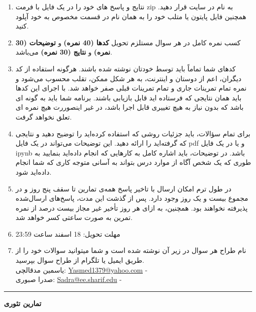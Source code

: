 \documentclass[a4paper]{article}
\begin{document}
\begin{enumerate}
	\item 
نتایج و پاسخ های خود را در یک فایل با فرمت zip به نام
 در سایت  
\href{https://quera.org/course/add_to_course/course/10598/}{} 
 قرار دهید. همچنین فایل پایتون یا متلب خود را به همان نام در قسمت مخصوص به خود آپلود کنید.
\item 
کسب نمره کامل در هر سوال مستلزم تحویل  
\textbf{کدها (40 نمره)}
 و
\textbf{توضیحات (30 نمره)}
و
\textbf{نتایج (30 نمره)}
 می‌باشد. 
\item 
کدهای شما تماماً باید توسط خودتان نوشته شده باشند. هرگونه استفاده از کد دیگران، اعم از دوستان و اینترنت، به هر شکل ممکن، تقلب محسوب می‌شود و نمره تمام تمرینات جاری و تمام تمرینات قبلی صفر خواهد شد. با اجرای این کدها باید همان نتایجی که فرستاده اید قابل بازیابی باشند. برنامه شما باید به گونه ای باشد که بدون نیاز به هیچ تغییری قابل اجرا باشد، در غیر اینصوررت هیچ نمره ای تعلق نخواهد گرفت. 
\item 
برای تمام سؤالات، باید جزئیات روشی که استفاده کرده‌اید را توضیح دهید و نتایجی که گرفته‌اید را ارائه دهید. این توضیحات می‌تواند در یک فایل  pdf  و یا در یک فایل  ipynb باشد. در توضیحات، باید اشاره کامل به کارهایی که انجام داده‌اید بنمایید به طوری که یک شخص آگاه از موارد درس بتواند به آسانی متوجه کاری که شما انجام داده‌اید شود.
\item 
در طول ترم امکان ارسال با تاخیر پاسخ  همه‌ی تمارین تا سقف پنج روز و در مجموع بیست و یک روز وجود دارد. پس از گذشت این مدت، پاسخ‌های ارسال‌شده پذیرفته نخواهند بود. همچنین، به ازای هر روز تأخیر غیر مجاز  بیست درصد از نمره تمرین به صورت ساعتی کسر خواهد شد.
\item 
مهلت تحویل: 18 اسفند ساعت 23:59 
\item 
نام طراح هر سوال در زیر آن نوشته شده است و شما میتوانید سوالات خود را از طریق ایمیل یا تلگرام از طراح سوال بپرسید.
\\
یاسمین مدقالچی: 
 \href{mailto:Yasmed1379@yahoo.com}{Yasmed1379@yahoo.com}
 - 
\\
صدرا صبوری: 
 \href{mailto:Sadra@ee.sharif.edu}{Sadra@ee.sharif.edu}
 - 
\end{enumerate}
\rule[0.1\baselineskip]{\textwidth}{1pt}

\clearpage
\textbf{\huge
	تمارین تئوری
}
\end{document}

